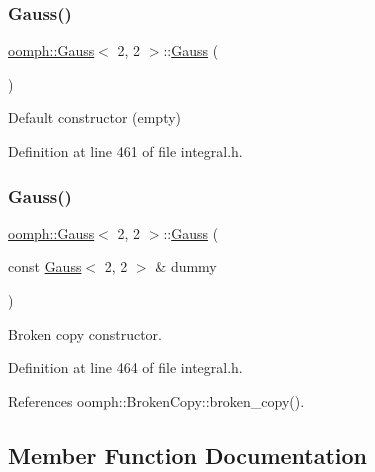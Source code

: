 \subsubsection{\texorpdfstring{Gauss()}{Gauss()}\hspace{0.1cm}{\footnotesize\ttfamily [1/2]}}
{\footnotesize\ttfamily \hyperlink{classoomph_1_1Gauss}{oomph\+::\+Gauss}$<$ 2, 2 $>$\+::\hyperlink{classoomph_1_1Gauss}{Gauss} (\begin{DoxyParamCaption}{ }\end{DoxyParamCaption})\hspace{0.3cm}{\ttfamily [inline]}}



Default constructor (empty) 



Definition at line 461 of file integral.\+h.

\mbox{\label{classoomph_1_1Gauss_3_012_00_012_01_4_af5d6a3e32c742bb5e65c6f422749238e}} 
\subsubsection{\texorpdfstring{Gauss()}{Gauss()}\hspace{0.1cm}{\footnotesize\ttfamily [2/2]}}
{\footnotesize\ttfamily \hyperlink{classoomph_1_1Gauss}{oomph\+::\+Gauss}$<$ 2, 2 $>$\+::\hyperlink{classoomph_1_1Gauss}{Gauss} (\begin{DoxyParamCaption}\item[{const \hyperlink{classoomph_1_1Gauss}{Gauss}$<$ 2, 2 $>$ \&}]{dummy }\end{DoxyParamCaption})\hspace{0.3cm}{\ttfamily [inline]}}



Broken copy constructor. 



Definition at line 464 of file integral.\+h.



References oomph\+::\+Broken\+Copy\+::broken\+\_\+copy().



\subsection{Member Function Documentation}
\mbox{\label{classoomph_1_1Gauss_3_012_00_012_01_4_a03844a134ad18991861fd0d694c28582}} 
